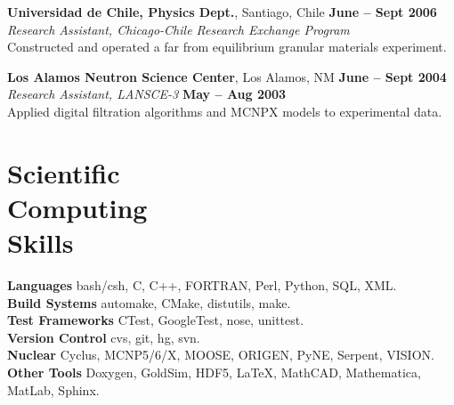 \documentclass[margin,line]{resume}
\begin{document}
\begin{resume}
    \textbf{Universidad de Chile, Physics Dept.}, Santiago, Chile \hfill \textbf{June -- Sept 2006}\\
                \textsl{Research Assistant, Chicago-Chile Research Exchange Program}\\
                 Constructed and operated a far from equilibrium granular materials experiment.  \vspace{-3mm}

    \textbf{Los Alamos Neutron Science Center}, Los Alamos, NM \hfill \textbf{June -- Sept 2004}\\ 
                \textsl{Research Assistant, LANSCE-3} \hfill \textbf{May -- Aug 2003}\\
                Applied digital filtration algorithms and MCNPX models to experimental data.  \vspace{-3mm}
    \section{\mysidestyle Scientific\\Computing\\Skills} 
                \textbf{Languages} \hfill bash/csh, C, C++, FORTRAN, Perl, Python, SQL, XML.\vspace{.5mm}\\%
                \textbf{Build Systems} \hfill automake, CMake, distutils, make.\vspace{.5mm}\\%
                \textbf{Test Frameworks} \hfill CTest, GoogleTest, nose, unittest.\vspace{.5mm}\\%
                \textbf{Version Control} \hfill cvs, git, hg, svn.\vspace{.5mm}\\%
                \textbf{Nuclear} \hfill Cyclus, MCNP5/6/X, MOOSE, ORIGEN, PyNE, Serpent, VISION.\vspace{.5mm}\\%
                \textbf{Other Tools} \hfill Doxygen, GoldSim, HDF5, \LaTeX, MathCAD, Mathematica, MatLab, Sphinx.\vspace{.5mm}%
    \vspace{-3mm}

\end{resume}
\end{document}
